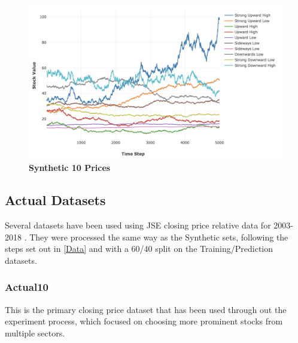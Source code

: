 \documentclass[a4paper,11pt,oneside]{article}
\theoremstyle{plain}
\theoremstyle{definition}
\begin{document}
	\begin{figure}[H]
		\centering
		\includegraphics[scale=0.35]{images/results/prices/synthetic10_prices.png} 
		\caption[Synthetic 10 Prices]{\textbf{Synthetic 10 Prices}}
		\label{figure-synthetic10_prices}
	\end{figure}
	
	\subsection{Actual Datasets}
	
	Several datasets have been used using JSE closing price relative data for 2003-2018 . They were processed the same way as the Synthetic sets, following the steps set out in \ref{Data} and with a 60/40 split on the Training/Prediction datasets.
	
	\subsubsection{Actual10}\label{dataset_actual10}
	
	This is the primary closing price dataset that has been used through out the experiment process, which focused on choosing more prominent stocks from multiple sectors.
	
\end{document}
